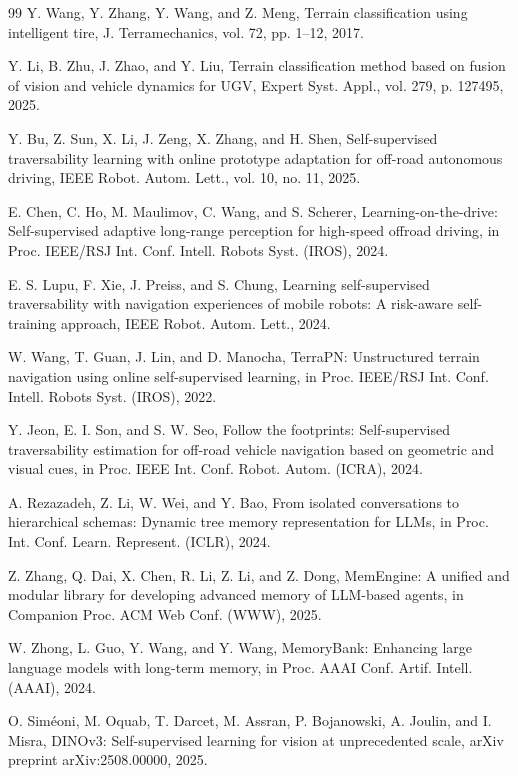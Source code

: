 \documentclass[letterpaper, 10 pt, conference]{ieeeconf}  %
\begin{document}
\begin{thebibliography}{99}
 Y. Wang, Y. Zhang, Y. Wang, and Z. Meng, Terrain classification using intelligent tire, J. Terramechanics, vol. 72, pp. 1--12, 2017.

 Y. Li, B. Zhu, J. Zhao, and Y. Liu, Terrain classification method based on fusion of vision and vehicle dynamics for UGV, Expert Syst. Appl., vol. 279, p. 127495, 2025.

 Y. Bu, Z. Sun, X. Li, J. Zeng, X. Zhang, and H. Shen, Self-supervised traversability learning with online prototype adaptation for off-road autonomous driving, IEEE Robot. Autom. Lett., vol. 10, no. 11, 2025.

 E. Chen, C. Ho, M. Maulimov, C. Wang, and S. Scherer, Learning-on-the-drive: Self-supervised adaptive long-range perception for high-speed offroad driving, in Proc. IEEE/RSJ Int. Conf. Intell. Robots Syst. (IROS), 2024.

 E. S. Lupu, F. Xie, J. Preiss, and S. Chung, Learning self-supervised traversability with navigation experiences of mobile robots: A risk-aware self-training approach, IEEE Robot. Autom. Lett., 2024.

 W. Wang, T. Guan, J. Lin, and D. Manocha, TerraPN: Unstructured terrain navigation using online self-supervised learning, in Proc. IEEE/RSJ Int. Conf. Intell. Robots Syst. (IROS), 2022.

 Y. Jeon, E. I. Son, and S. W. Seo, Follow the footprints: Self-supervised traversability estimation for off-road vehicle navigation based on geometric and visual cues, in Proc. IEEE Int. Conf. Robot. Autom. (ICRA), 2024.

 A. Rezazadeh, Z. Li, W. Wei, and Y. Bao, From isolated conversations to hierarchical schemas: Dynamic tree memory representation for LLMs, in Proc. Int. Conf. Learn. Represent. (ICLR), 2024.

 Z. Zhang, Q. Dai, X. Chen, R. Li, Z. Li, and Z. Dong, MemEngine: A unified and modular library for developing advanced memory of LLM-based agents, in Companion Proc. ACM Web Conf. (WWW), 2025.

 W. Zhong, L. Guo, Y. Wang, and Y. Wang, MemoryBank: Enhancing large language models with long-term memory, in Proc. AAAI Conf. Artif. Intell. (AAAI), 2024.

 O. Siméoni, M. Oquab, T. Darcet, M. Assran, P. Bojanowski, A. Joulin, and I. Misra, DINOv3: Self-supervised learning for vision at unprecedented scale, arXiv preprint arXiv:2508.00000, 2025.

\end{thebibliography}
\end{document}
